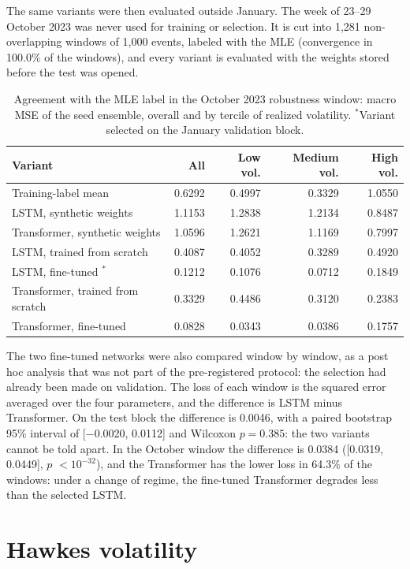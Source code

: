 \label{sec:real-robustness}
The same variants were then evaluated outside January. The week of 23--29 October 2023 was
never used for training or selection. It is cut into
1,281 non-overlapping windows of 1,000 events, labeled with the MLE (convergence in 100.0\% of
the windows), and every variant is evaluated with the weights stored before the test was
opened.

\begin{table}[htbp]
\centering
\caption{Agreement with the MLE label in the October 2023 robustness window: macro MSE of the
seed ensemble, overall and by tercile of realized volatility. $^{\ast}$Variant selected on
the January validation block.}
\label{tab:real-robustness}
\small
\begin{tabular}{lrrrr}
\toprule
Variant & All & Low vol. & Medium vol. & High vol.\\
\midrule
Training-label mean & 0.6292 & 0.4997 & 0.3329 & 1.0550\\
LSTM, synthetic weights & 1.1153 & 1.2838 & 1.2134 & 0.8487\\
Transformer, synthetic weights & 1.0596 & 1.2621 & 1.1169 & 0.7997\\
LSTM, trained from scratch & 0.4087 & 0.4052 & 0.3289 & 0.4920\\
LSTM, fine-tuned $^{\ast}$ & 0.1212 & 0.1076 & 0.0712 & 0.1849\\
Transformer, trained from scratch & 0.3329 & 0.4486 & 0.3120 & 0.2383\\
Transformer, fine-tuned & 0.0828 & 0.0343 & 0.0386 & 0.1757\\
\bottomrule
\end{tabular}
\end{table}


The two fine-tuned networks were also compared window by window, as a post hoc analysis that
was not part of the pre-registered protocol: the selection had already been made on
validation. The loss of each window is the squared error averaged over the four parameters,
and the difference is LSTM minus Transformer. On the test block the difference is
0.0046, with a paired bootstrap 95\% interval of
[$-$0.0020, 0.0112] and Wilcoxon $p=0.385$: the two variants cannot be told
apart. In the October window the difference is 0.0384
([0.0319, 0.0449], $p$ $<10^{-32}$), and the Transformer has the lower loss in
64.3\% of the windows: under a change of regime, the fine-tuned
Transformer degrades less than the selected LSTM.

\section{Hawkes volatility}
\label{sec:real-volatility}


